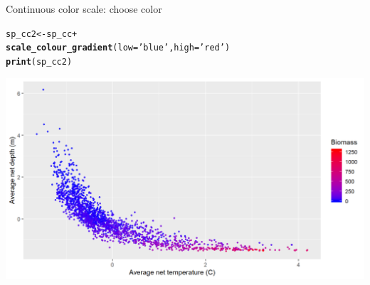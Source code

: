 \documentclass{beamer}\usepackage[]{graphicx}\usepackage[]{color}
\makeatletter
\newcommand{\hlstr}[1]{\textcolor[rgb]{0.192,0.494,0.8}{#1}}%
\newcommand{\hlopt}[1]{\textcolor[rgb]{0,0,0}{#1}}%
\newcommand{\hlstd}[1]{\textcolor[rgb]{0.345,0.345,0.345}{#1}}%
\newcommand{\hlkwb}[1]{\textcolor[rgb]{0.69,0.353,0.396}{#1}}%
\newcommand{\hlkwc}[1]{\textcolor[rgb]{0.333,0.667,0.333}{#1}}%
\newcommand{\hlkwd}[1]{\textcolor[rgb]{0.737,0.353,0.396}{\textbf{#1}}}%
\newenvironment{kframe}{%
 \def\at@end@of@kframe{}%
 \ifinner\ifhmode%
  \def\at@end@of@kframe{\end{minipage}}%
  \begin{minipage}{\columnwidth}%
 \fi\fi%
 \def\FrameCommand##1{\hskip\@totalleftmargin \hskip-\fboxsep
 \colorbox{shadecolor}{##1}\hskip-\fboxsep
     \hskip-\linewidth \hskip-\@totalleftmargin \hskip\columnwidth}%
 \MakeFramed {\advance\hsize-\width
   \@totalleftmargin\z@ \linewidth\hsize
   \@setminipage}}%
 {\par\unskip\endMakeFramed%
 \at@end@of@kframe}
\newenvironment{knitrout}{}{} %
\makeatother
\begin{document}
\begin{frame}[fragile]{Continuous color scale: choose color}
\begin{knitrout}\footnotesize
{}\color{fgcolor}\begin{kframe}
\begin{alltt}
\hlstd{sp_cc2} \hlkwb{<-} \hlstd{sp_cc} \hlopt{+}
  \hlkwd{scale_colour_gradient}\hlstd{(}\hlkwc{low} \hlstd{=} \hlstr{'blue'}\hlstd{,} \hlkwc{high} \hlstd{=} \hlstr{'red'}\hlstd{)}
\hlkwd{print}\hlstd{(sp_cc2)}
\end{alltt}
\end{kframe}

{\centering \includegraphics[width=.9\linewidth]{figure/sp_continuous_color2-1} 

}



\end{knitrout}
\end{frame}
\end{document}
